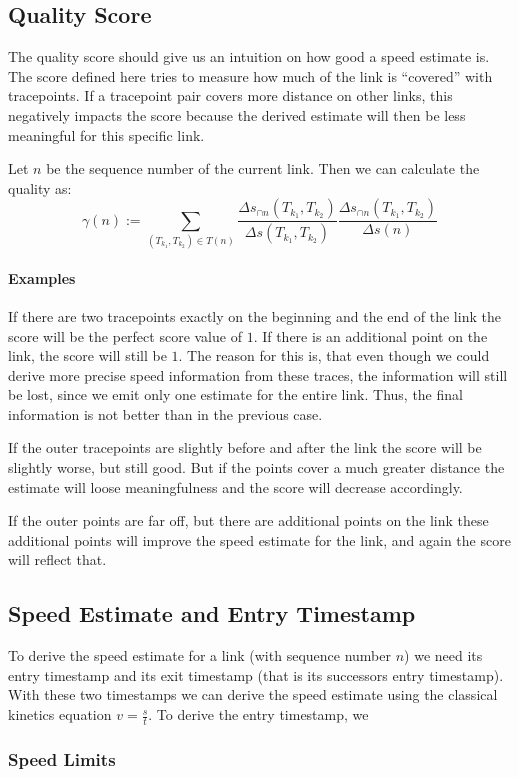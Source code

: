 \documentclass{scrartcl}
\begin{document}
\subsection{Quality Score}

The quality score should give us an intuition on how good a speed estimate is.
The score defined here tries to measure how much of the link is ``covered'' with tracepoints.
If a tracepoint pair covers more distance on other links, this negatively impacts the score because the derived estimate will then be less meaningful for this specific link.

Let $n$ be the sequence number of the current link.
Then we can calculate the quality as:
\[ \gamma(n) := \sum_{(T_{k_1}, T_{k_2}) \in T(n)} \frac{\Delta s_{\cap n}(T_{k_1}, T_{k_2})}{\Delta s(T_{k_1}, T_{k_2})} \frac{\Delta s_{\cap n}(T_{k_1}, T_{k_2})}{\Delta s(n)} \]

\paragraph{Examples}

If there are two tracepoints exactly on the beginning and the end of the link the score will be the perfect score value of $1$.
If there is an additional point on the link, the score will still be $1$.
The reason for this is, that even though we could derive more precise speed information from these traces, the information will still be lost, since we emit only one estimate for the entire link.
Thus, the final information is not better than in the previous case.

If the outer tracepoints are slightly before and after the link the score will be slightly worse, but still good.
But if the points cover a much greater distance the estimate will loose meaningfulness and the score will decrease accordingly.

If the outer points are far off, but there are additional points on the link these additional points will improve the speed estimate for the link, and again the score will reflect that.

\subsection{Speed Estimate and Entry Timestamp}

To derive the speed estimate for a link (with sequence number $n$) we need its entry timestamp and its exit timestamp (that is its successors entry timestamp).
With these two timestamps we can derive the speed estimate using the classical kinetics equation $v = \frac{s}{t}$.
To derive the entry timestamp, we

\subsubsection{Speed Limits}

\end{document}
